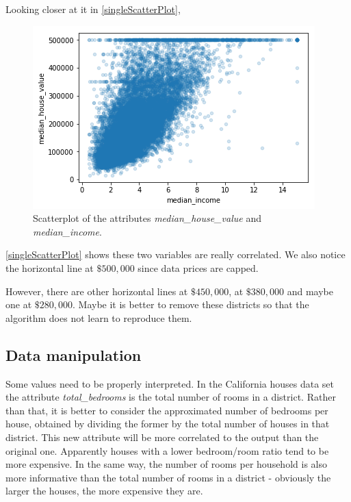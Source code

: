 \documentclass[12pt, letterpaper]{article}
\theoremstyle{definition}
\let\ti\textit
\begin{document}
Looking closer at it in \autoref{singleScatterPlot},
\begin{figure}
\centering
\includegraphics[scale=0.8]{img/singleScatterPlot}
\caption{Scatterplot of the attributes \ti{median\_house\_value} and \ti{median\_income}.}
\label{singleScatterPlot}
\end{figure}

\autoref{singleScatterPlot} shows these two variables are really correlated. We also notice the horizontal line at $\$500,000$ since data prices are capped.

However, there are other horizontal lines at $\$450,000$, at $\$380,000$ and maybe one at $\$280,000$. Maybe it is better to remove these districts so that the algorithm does not learn to reproduce them.

\subsection{Data manipulation}
Some values need to be properly interpreted. In the California houses data set the attribute \ti{total\_bedrooms} is the total number of rooms in a district. Rather than that, it is better to consider the approximated number of bedrooms per house, obtained by dividing the former by the total number of houses in that district. This new attribute will be more correlated to the output than the original one. Apparently houses with a lower bedroom/room ratio tend to be more expensive. 
In the same way, the number of rooms per household is also more informative than the total number of rooms in a district - obviously the larger the houses, the more expensive they are.
\end{document}
